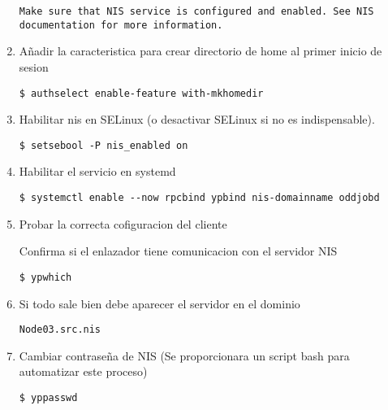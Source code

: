 \documentclass[../main.tex]{subfiles}
\begin{document}
\begin{enumerate}
\begin{listing}[H]
\begin{verbatim}
Make sure that NIS service is configured and enabled. See NIS documentation for more information.
\end{verbatim}
\end{listing}

  \item Añadir la caracteristica para crear directorio de home al
        primer inicio de sesion

        \begin{listing}[H]
\begin{verbatim}
$ authselect enable-feature with-mkhomedir
\end{verbatim}
\end{listing}

  \item Habilitar nis en SELinux (o desactivar SELinux si no es indispensable).

        \begin{listing}[H]
\begin{verbatim}
$ setsebool -P nis_enabled on
\end{verbatim}
\end{listing}

  \item Habilitar el servicio en systemd

        \begin{listing}[H]
\begin{verbatim}
$ systemctl enable --now rpcbind ypbind nis-domainname oddjobd
\end{verbatim}
\end{listing}

  \item Probar la correcta cofiguracion del cliente

        Confirma si el enlazador tiene comunicacion con el servidor NIS
        \begin{listing}[H]
\begin{verbatim}
$ ypwhich
\end{verbatim}
\end{listing}
  \item Si todo sale bien debe aparecer el servidor en el dominio
        \begin{listing}[H]
\begin{verbatim}
Node03.src.nis
\end{verbatim}
\end{listing}
  \item Cambiar contraseña de NIS (Se proporcionara un
        script bash para automatizar este proceso)

        \begin{listing}[H]
\begin{verbatim}
$ yppasswd
\end{verbatim}
\end{listing}

\end{enumerate}
\end{document}
